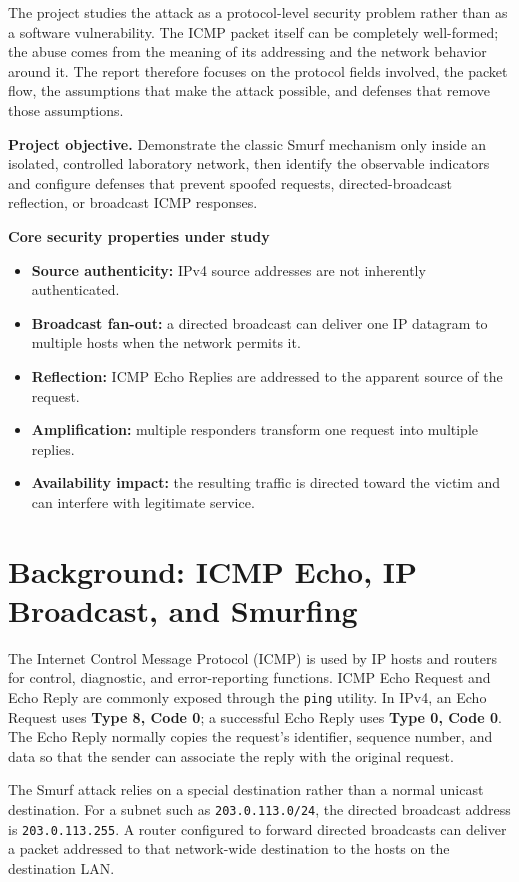 \documentclass[12pt,a4paper]{article}
\begin{document}
The project studies the attack as a protocol-level security problem rather than as a software vulnerability. The ICMP packet itself can be completely well-formed; the abuse comes from the meaning of its addressing and the network behavior around it. The report therefore focuses on the protocol fields involved, the packet flow, the assumptions that make the attack possible, and defenses that remove those assumptions.

\textbf{Project objective.} Demonstrate the classic Smurf mechanism only inside an isolated, controlled laboratory network, then identify the observable indicators and configure defenses that prevent spoofed requests, directed-broadcast reflection, or broadcast ICMP responses.

\textbf{Core security properties under study}
\begin{itemize}
\item \textbf{Source authenticity:} IPv4 source addresses are not inherently authenticated.
\item \textbf{Broadcast fan-out:} a directed broadcast can deliver one IP datagram to multiple hosts when the network permits it.
\item \textbf{Reflection:} ICMP Echo Replies are addressed to the apparent source of the request.
\item \textbf{Amplification:} multiple responders transform one request into multiple replies.
\item \textbf{Availability impact:} the resulting traffic is directed toward the victim and can interfere with legitimate service.
\end{itemize}

\section{Background: ICMP Echo, IP Broadcast, and Smurfing}
The Internet Control Message Protocol (ICMP) is used by IP hosts and routers for control, diagnostic, and error-reporting functions. ICMP Echo Request and Echo Reply are commonly exposed through the \texttt{ping} utility. In IPv4, an Echo Request uses \textbf{Type 8, Code 0}; a successful Echo Reply uses \textbf{Type 0, Code 0}. The Echo Reply normally copies the request's identifier, sequence number, and data so that the sender can associate the reply with the original request.

The Smurf attack relies on a special destination rather than a normal unicast destination. For a subnet such as \texttt{203.0.113.0/24}, the directed broadcast address is \texttt{203.0.113.255}. A router configured to forward directed broadcasts can deliver a packet addressed to that network-wide destination to the hosts on the destination LAN.
\end{document}

